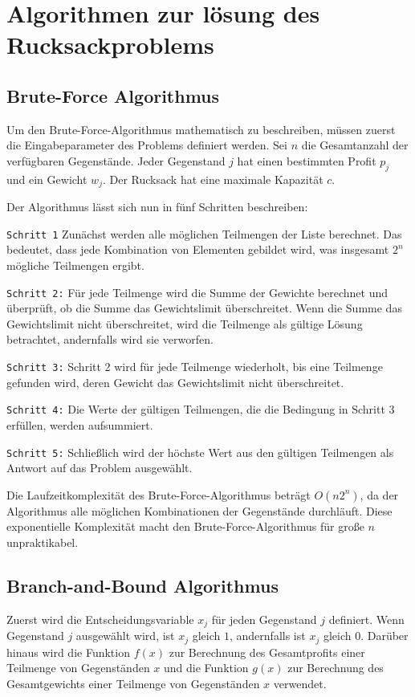 
\chapter{Algorithmen zur lösung des Rucksackproblems}
\section{Brute-Force Algorithmus}
Um den Brute-Force-Algorithmus mathematisch zu beschreiben, 
müssen zuerst die Eingabeparameter des Problems definiert werden. Sei 
$n$ die Gesamtanzahl der verfügbaren Gegenstände. Jeder 
Gegenstand $j$ hat einen bestimmten Profit $p_j$ und ein Gewicht $w_j$. 
Der Rucksack hat eine maximale Kapazität $c$.

Der Algorithmus lässt sich nun in fünf Schritten beschreiben:

\texttt{Schritt 1}
Zunächst werden alle möglichen Teilmengen der Liste berechnet. 
Das bedeutet, dass jede Kombination von Elementen gebildet 
wird, was insgesamt $2^n$ mögliche Teilmengen ergibt.

\texttt{Schritt 2:}
Für jede Teilmenge wird die Summe der Gewichte berechnet und 
überprüft, ob die Summe das Gewichtslimit  
überschreitet. Wenn die Summe das Gewichtslimit nicht 
überschreitet, wird die Teilmenge als gültige Lösung 
betrachtet, andernfalls wird sie verworfen.

\texttt{Schritt 3:}
Schritt 2 wird für jede Teilmenge wiederholt, bis eine 
Teilmenge gefunden wird, deren Gewicht das Gewichtslimit 
nicht überschreitet.

\texttt{Schritt 4:}
Die Werte der gültigen Teilmengen, die die Bedingung in 
Schritt 3 erfüllen, werden aufsummiert.

\texttt{Schritt 5:}
Schließlich wird der höchste Wert aus den gültigen 
Teilmengen als Antwort auf das Problem ausgewählt.\ \cite[vgl.]{balogun2022explanatory}

Die Laufzeitkomplexität des Brute-Force-Algorithmus beträgt 
$O(n2^n)$, da der Algorithmus alle möglichen Kombinationen der 
Gegenstände durchläuft. Diese exponentielle Komplexität 
macht den Brute-Force-Algorithmus für große $n$ unpraktikabel.\ \cite[vlg.]{hristakeva2005different}

\section{Branch-and-Bound Algorithmus}
Zuerst wird die Entscheidungsvariable $x_j$ für jeden 
Gegenstand $j$ definiert. Wenn Gegenstand $j$ ausgewählt wird, ist $x_j$ 
gleich $1$, andernfalls ist $x_j$ gleich $0$. Darüber hinaus 
wird die Funktion $f(x)$ zur Berechnung des 
Gesamtprofits einer Teilmenge von Gegenständen $x$ und die 
Funktion $g(x)$ zur Berechnung des Gesamtgewichts einer 
Teilmenge von Gegenständen $x$ verwendet.

